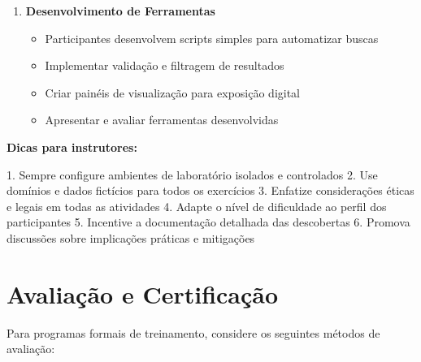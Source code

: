 \documentclass[12pt,a4paper]{book}
\begin{document}
\begin{enumerate}
    \item \textbf{Desenvolvimento de Ferramentas}
    \begin{itemize}
        \item Participantes desenvolvem scripts simples para automatizar buscas
        \item Implementar validação e filtragem de resultados
        \item Criar painéis de visualização para exposição digital
        \item Apresentar e avaliar ferramentas desenvolvidas
    \end{itemize}
\end{enumerate}

\begin{tipbox}
\textbf{Dicas para instrutores:}

1. Sempre configure ambientes de laboratório isolados e controlados
2. Use domínios e dados fictícios para todos os exercícios
3. Enfatize considerações éticas e legais em todas as atividades
4. Adapte o nível de dificuldade ao perfil dos participantes
5. Incentive a documentação detalhada das descobertas
6. Promova discussões sobre implicações práticas e mitigações
\end{tipbox}

\section{Avaliação e Certificação}

Para programas formais de treinamento, considere os seguintes métodos de avaliação:
\end{document}
